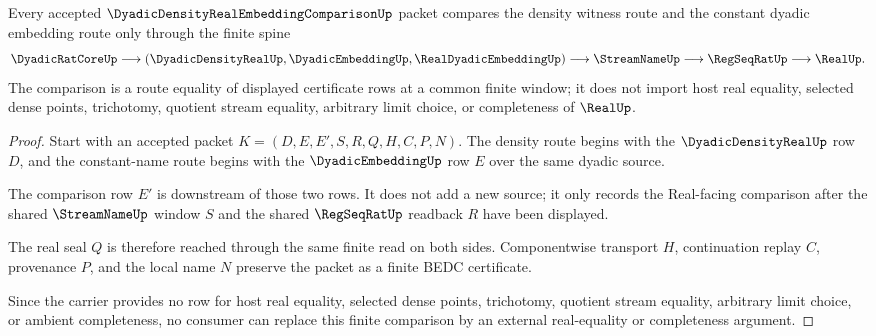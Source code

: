 \begin{theorem}
\label{thm:dyadic-density-real-embedding-comparison-route}
Every accepted $\DyadicDensityRealEmbeddingComparisonUp$ packet compares the
density witness route and the constant dyadic embedding route only through the
finite spine
$$
\DyadicRatCoreUp \longrightarrow
(\DyadicDensityRealUp,\DyadicEmbeddingUp,\RealDyadicEmbeddingUp)
\longrightarrow \StreamNameUp \longrightarrow \RegSeqRatUp \longrightarrow
\RealUp .
$$
The comparison is a route equality of displayed certificate rows at a common
finite window; it does not import host real equality, selected dense points,
trichotomy, quotient stream equality, arbitrary limit choice, or completeness
of $\RealUp$.
\end{theorem}
\begin{proof}
Start with an accepted packet
$K=(D,E,E',S,R,Q,H,C,P,N)$. The density route begins with the
$\DyadicDensityRealUp$ row $D$, and the constant-name route begins with the
$\DyadicEmbeddingUp$ row $E$ over the same dyadic source.

The comparison row $E'$ is downstream of those two rows. It does not add a new
source; it only records the Real-facing comparison after the shared
$\StreamNameUp$ window $S$ and the shared $\RegSeqRatUp$ readback $R$ have
been displayed.

The real seal $Q$ is therefore reached through the same finite read on both
sides. Componentwise transport $H$, continuation replay $C$, provenance $P$,
and the local name $N$ preserve the packet as a finite BEDC certificate.

Since the carrier provides no row for host real equality, selected dense
points, trichotomy, quotient stream equality, arbitrary limit choice, or
ambient completeness, no consumer can replace this finite comparison by an
external real-equality or completeness argument.
\end{proof}


